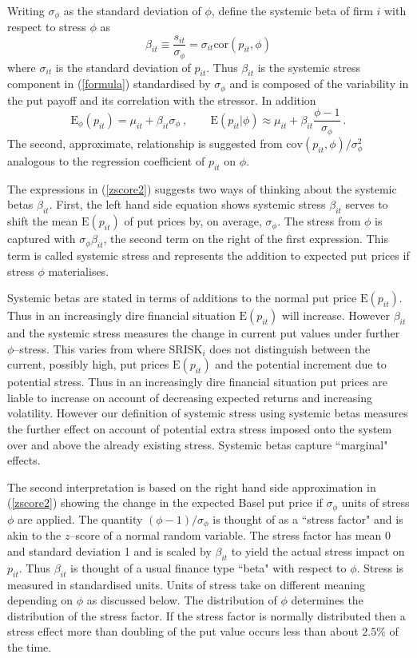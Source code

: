 \documentclass[authoryear]{elsarticle}
\newcommand{\E}{\mathrm{E}}
\newcommand{\cov}{\mathrm{cov}}
\newcommand{\Es}{\E_\phi}
\newcommand{\cor}{\mathrm{cor}}
\newcommand{\eref}[1]{(\ref{#1})}
\newcommand{\cq}{\ , \qquad}
\newcommand{\be}[1]{\begin{equation}\label{#1}}
\newcommand{\ee}{\end{equation}}
\begin{document}
Writing  $\sigma_{\phi}$ as the standard deviation of $\phi$,  define the systemic beta of firm $i$ with respect to stress $\phi$ as
\be{zscore}
\beta_{it}\equiv \frac{s_{it}}{\sigma_\phi} = \sigma_{it}\cor(p_{it},\phi)
\ee
where $\sigma_{it}$ is the standard deviation of $p_{it}$.   Thus $\beta_{it}$ is the systemic stress component in \eref{formula} standardised by $\sigma_\phi$ and is composed of the variability in the put payoff and its correlation with the stressor. In addition
\be{zscore2}
\Es(p_{it})  = \mu_{it} + \beta_{it}\sigma_\phi\cq \E(p_{it}|\phi) \approx \mu_{it} + \beta_{it}\frac{\phi-1}{\sigma_\phi}\ .
\ee
The second, approximate, relationship is suggested from   $\cov(p_{it},\phi)/\sigma^2_\phi$ analogous to the regression coefficient of $p_{it}$ on $\phi$.

The expressions in \eref{zscore2} suggests two ways of  thinking about the  systemic betas  $\beta_{it}$.   First, the left hand side equation shows systemic stress $\beta_{it}$ serves to shift the mean $\E(p_{it})$ of put prices  by, on average, $\sigma_\phi$.    The stress from $\phi$ is captured with $\sigma_\phi\beta_{it}$, the second term on the right of the first expression.   This term is called systemic stress and represents the addition to expected put prices if stress $\phi$ materialises.

Systemic betas are stated in terms of additions to the normal put price $\E(p_{it})$. Thus in an increasingly dire financial situation $\E(p_{it})$ will increase.   However  $\beta_{it}$ and the systemic stress measures the  change in current put values  under  further $\phi$--stress.  This varies from  \cite{brownlees2015} where $\mathrm{SRISK}_i$ does not distinguish between the current, possibly high, put prices $\E(p_{it})$ and the potential  increment due to potential stress.   Thus in an increasingly dire financial situation put prices are liable to increase on account of decreasing expected returns and increasing volatility.   However our definition of systemic stress using systemic betas measures the further effect on account of potential extra stress imposed onto the system over and above the already existing stress.   Systemic betas capture   ``marginal" effects.

The second interpretation is based on  the right hand side approximation in \eref{zscore2} showing   the change in the  expected Basel put price if  $\sigma_\phi$ units of stress $\phi$ are applied.  The quantity $(\phi-1)/\sigma_\phi$ is thought of as a ``stress factor" and is akin to the $z$--score of a normal random variable.  The stress factor has mean 0 and standard deviation 1 and is scaled by $\beta_{it}$ to yield the actual stress impact on  $p_{it}$.  Thus  $\beta_{it}$ is thought of a usual finance type ``beta" with respect to $\phi$.   Stress is measured in standardised units.  Units of stress take on different meaning depending on  $\phi$ as discussed below. The distribution of $\phi$ determines the distribution of the stress factor. If the stress factor is normally distributed then a stress effect more than doubling of the put value  occurs less than about $2.5\%$ of the time.
\end{document}
